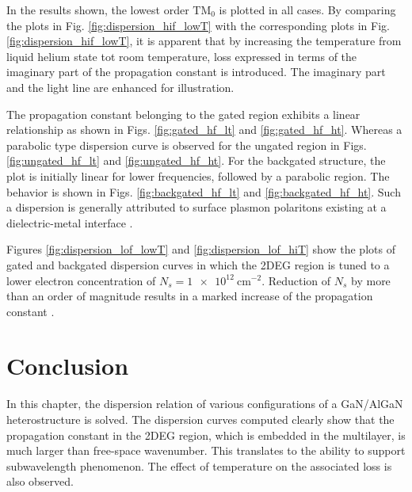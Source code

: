 \documentclass[12pt]{article}
\begin{document}
In the results shown, the lowest order $\text{TM}_0$ is plotted in all cases. By comparing the plots in Fig. \ref{fig:dispersion_hif_lowT} with the corresponding plots in Fig. \ref{fig:dispersion_hif_lowT}, it is apparent that by increasing the temperature from liquid helium state tot room temperature, loss expressed in terms of the imaginary part of the propagation constant is introduced. The imaginary part and the light line are enhanced for illustration.

The propagation constant belonging to the gated region exhibits a linear relationship \cite{Sydoruk2015,Ando1982} as shown in Figs. \ref{fig:gated_hf_lt} and \ref{fig:gated_hf_ht}. Whereas a parabolic type dispersion curve is observed for the ungated region in Figs. \ref{fig:ungated_hf_lt} and \ref{fig:ungated_hf_ht}. For the backgated structure, the plot is initially linear for lower frequencies, followed by a parabolic region. The behavior is shown in Figs. \ref{fig:backgated_hf_lt} and
\ref{fig:backgated_hf_ht}. Such a dispersion is generally attributed to surface plasmon polaritons existing at a dielectric-metal interface \cite{Yoon2014}.

Figures \ref{fig:dispersion_lof_lowT} and \ref{fig:dispersion_lof_hiT} show the plots of gated and backgated dispersion curves in which the 2DEG region is tuned to a lower electron concentration of $N_s = \SI{1e12}{\cm^{-2}}$. Reduction of $N_s$ by more than an order of magnitude results in a marked increase of the propagation constant \cite{Sydoruk2015a}.
\section{Conclusion}
%
In this chapter, the dispersion relation of various configurations of a GaN/AlGaN heterostructure is solved. The dispersion curves computed clearly show that the propagation constant in the 2DEG region, which is embedded in the multilayer, is much larger than free-space wavenumber. This translates to the ability to support subwavelength phenomenon. The effect of temperature on the  associated loss is also observed.

\clearpage %
% 


\end{document}
